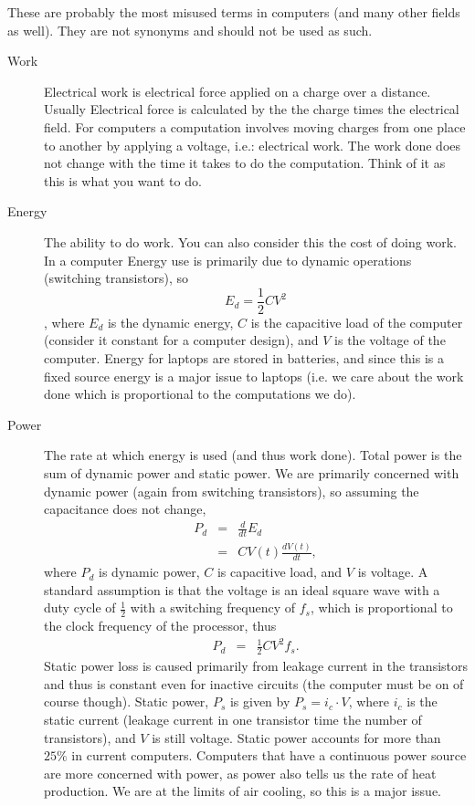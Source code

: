 These are probably the most misused terms in computers (and many other fields as well).  They are not synonyms and should not be used as such.
\begin{description}
  \item[Work] Electrical work is electrical force applied on a charge over a distance.  Usually Electrical force is calculated by the the charge times the electrical field.  For computers a computation involves moving charges from one place to another by applying a voltage, i.e.: electrical work.  The work done does not change with the time it takes to do the computation.  Think of it as this is what you want to do.
  \item[Energy] The ability to do work.  You can also consider this the cost of doing work.  In a computer Energy use is primarily due to dynamic operations (switching transistors), so $$E_{d}=\frac{1}{2}C V^2$$, where $E_d$ is the dynamic energy, $C$ is the capacitive load of the computer (consider it constant for a computer design), and $V$ is the voltage of the computer.  Energy for laptops are stored in batteries, and since this is a fixed source energy is a major issue to laptops (i.e. we care about the work done which is proportional to the computations we do).
  \item[Power] The rate at which energy is used (and thus work done).  Total power is the sum of dynamic power and static power.  We are primarily concerned with dynamic power (again from switching transistors), so assuming the capacitance does not change,
      \begin{eqnarray}
      P_d&=&\frac{d}{dt}E_d\\
      &=&CV(t)\frac{dV(t)}{dt},
      \end{eqnarray}
      where $P_d$ is dynamic power, $C$ is capacitive load, and $V$ is voltage.  A standard assumption is that the voltage is an ideal square wave with a duty cycle of $\frac{1}{2}$ with a switching frequency of $f_s$, which is proportional to the clock frequency of the processor, thus
      \begin{eqnarray}
      P_d&=&\frac{1}{2}CV^2f_s.
      \end{eqnarray}
      Static power loss is caused primarily from leakage current in the transistors and thus is constant even for inactive circuits (the computer must be on of course though).  Static power, $P_s$ is given by $P_s=i_c\cdot V$, where $i_c$ is the static current (leakage current in one transistor time the number of transistors), and $V$ is still voltage.  Static power accounts for more than $25\%$ in current computers.  Computers that have a continuous power source are more concerned with power, as power also tells us the rate of heat production.  We are at the limits of air cooling, so this is a major issue.
\end{description}

